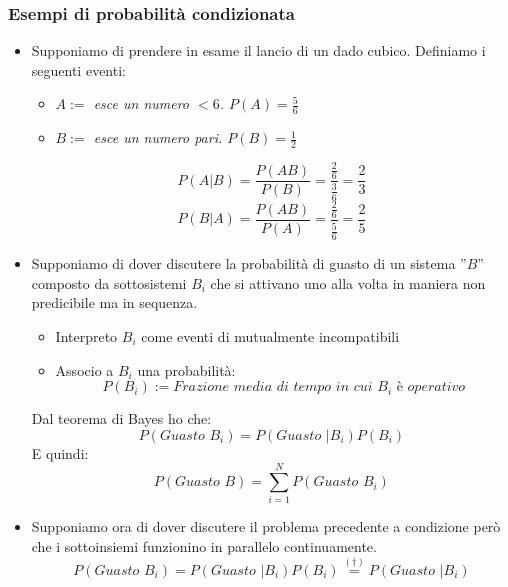 \documentclass[11pt,a4paper]{book}
\begin{document}
\subsubsection{Esempi di probabilità condizionata}
\begin{itemize}
\item Supponiamo di prendere in esame il lancio di un dado cubico. Definiamo i seguenti eventi:
\begin{itemize}
\item \textit{$ A:=  $ esce un numero  $ <6 $. $ P(A) = \frac{5}{6}$}
\item \textit{$ B:= $ esce un numero pari. $ P(B)= \frac{1}{2} $}
\end{itemize}
\begin{equation}
P(A|B) = \frac{P(AB)}{P(B)} = \frac{\frac{2}{6}}{\frac{3}{6}} = \frac{2}{3}
\end{equation}
\begin{equation}
P(B|A) = \frac{P(AB)}{P(A)} = \frac{\frac{2}{6}}{\frac{5}{6}} = \frac{2}{5}
\end{equation}
\item Supponiamo di dover discutere la probabilità di guasto di un sistema ''$ B $'' composto da sottosistemi $ B_i $ che si attivano uno alla volta in maniera non predicibile ma in sequenza.
\begin{itemize}
\item Interpreto $ B_i $ come eventi di mutualmente incompatibili
\item Associo a $ B_i $ una probabilità:
\begin{equation}
P(B_i) := \textit{Frazione media di tempo in cui } B_i \textit{ è operativo}
\end{equation}
\end{itemize}
Dal teorema di Bayes ho che:
\begin{equation}
P(\textit{Guasto }B_i) = P(\textit{Guasto }|B_i)P(B_i)
\end{equation}
E quindi:
\begin{equation}
P(\textit{Guasto }B) = \sum\limits_{i = 1}^{N} P(\textit{Guasto }B_i)
\end{equation}
\item Supponiamo ora di dover discutere il problema precedente a condizione però che i sottoinsiemi funzionino in parallelo continuamente.
\begin{equation}
P(\textit{Guasto }B_i) = P(\textit{Guasto }|B_i) P(B_i) \stackrel{(\dag)}{=} P(\textit{Guasto }|B_i) 
\end{equation}

\end{itemize}
\end{document}
